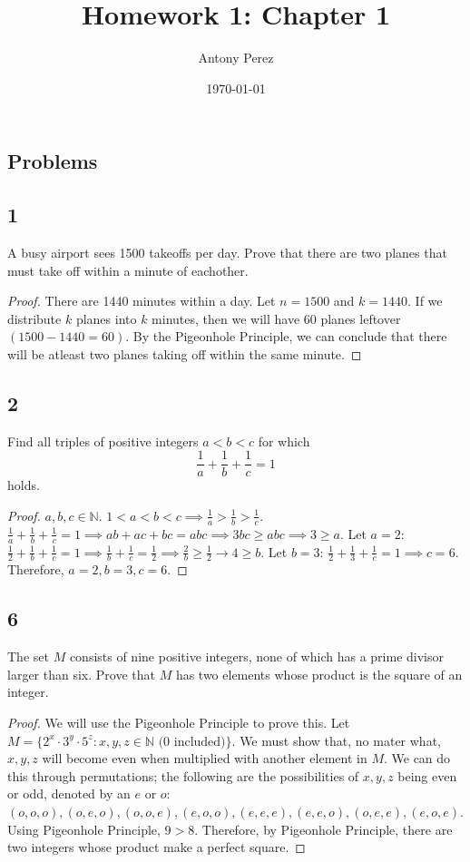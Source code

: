 \documentclass{amsart}
\title{Homework 1: Chapter 1}
\author{Antony Perez}
\date{\today}
\begin{document}
\maketitle
\subsection*{Problems}
\subsection*{1} A busy airport sees 1500 takeoffs per day. Prove that there are two planes that must take off within a minute of eachother.
\begin{proof}
    There are 1440 minutes within a day. Let $n = 1500$ and $k = 1440$. If we distribute $k$ planes into $k$ minutes, then we will have 60 planes leftover $(1500-1440 = 60)$.  By the Pigeonhole Principle, we can conclude that there will be atleast two planes taking off within the same minute. 
\end{proof}
\subsection*{2} Find all triples of positive integers $a<b<c$ for which 
\[\frac{1}{a} + \frac{1}{b}+ \frac{1}{c}=1\]
holds. 
\begin{proof}
    $a,b,c \in \mathbb{N}$. $1<a < b <c \implies \frac{1}{a} > \frac{1}{b} > \frac{1}{c}$. $\frac{1}{a} + \frac{1}{b}+ \frac{1}{c} =1 \implies ab + ac + bc = abc \implies 3bc \geq abc \implies 3 \geq a$. Let $a = 2:$ $\frac{1}{2} + \frac{1}{b} + \frac{1}{c} = 1 \implies \frac{1}{b} + \frac{1}{c} = \frac{1}{2} \implies \frac{2}{b} \geq \frac{1}{2} \rightarrow 4 \geq b$. Let $b = 3$: $\frac{1}{2}+\frac{1}{3} + \frac{1}{c} = 1 \implies c =6$. Therefore, $a=2, b= 3, c = 6$. 
\end{proof}
\subsection*{6} The set $M$ consists of nine positive integers, none of which has a prime divisor larger than six. Prove that $M$ has two elements whose product is the square of an integer. 
\begin{proof}
    We will use the Pigeonhole Principle to prove this. Let $M = \{2^x \cdot 3^y \cdot 5^z : x,y,z \in \mathbb{N} \text{ (0 included)}\}$. We must show that, no mater what, $x,y,z$ will become even when multiplied with another element in $M$. We can do this through permutations; the following are the possibilities of $x,y,z$ being even or odd, denoted by an $e$ or $o$: $(o,o,o), (o,e,o), (o,o,e), (e,o,o), (e,e,e), (e,e,o), (o,e,e), (e,o,e)$. Using Pigeonhole Principle, $9 > 8$. Therefore, by Pigeonhole Principle, there are two integers whose product make a perfect square. 
\end{proof}
\end{document}
